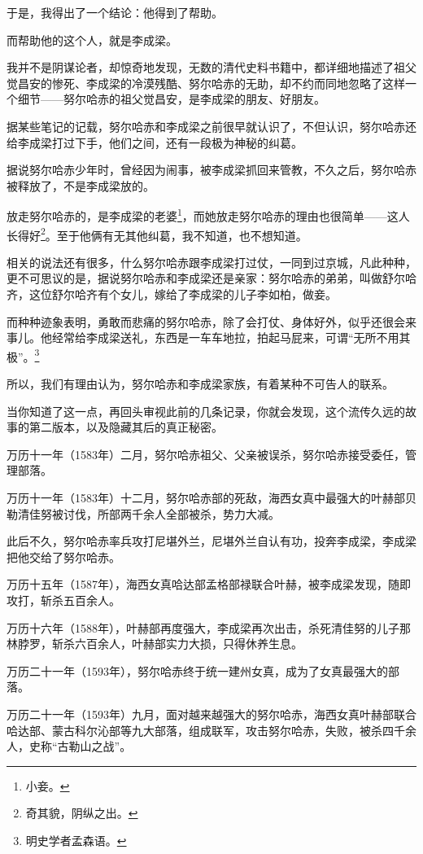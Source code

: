 \begin{multicols}{\theparacolNo}
于是，我得出了一个结论：他得到了帮助。

而帮助他的这个人，就是李成梁。

我并不是阴谋论者，却惊奇地发现，无数的清代史料书籍中，都详细地描述了祖父觉昌安的惨死、李成梁的冷漠残酷、努尔哈赤的无助，却不约而同地忽略了这样一个细节——努尔哈赤的祖父觉昌安，是李成梁的朋友、好朋友。

据某些笔记的记载，努尔哈赤和李成梁之前很早就认识了，不但认识，努尔哈赤还给李成梁打过下手，他们之间，还有一段极为神秘的纠葛。

据说努尔哈赤少年时，曾经因为闹事，被李成梁抓回来管教，不久之后，努尔哈赤被释放了，不是李成梁放的。

放走努尔哈赤的，是李成梁的老婆\footnote{小妾。}，而她放走努尔哈赤的理由也很简单——这人长得好\footnote{奇其貌，阴纵之出。}。至于他俩有无其他纠葛，我不知道，也不想知道。

相关的说法还有很多，什么努尔哈赤跟李成梁打过仗，一同到过京城，凡此种种，更不可思议的是，据说努尔哈赤和李成梁还是亲家：努尔哈赤的弟弟，叫做舒尔哈齐，这位舒尔哈齐有个女儿，嫁给了李成梁的儿子李如柏，做妾。

而种种迹象表明，勇敢而悲痛的努尔哈赤，除了会打仗、身体好外，似乎还很会来事儿。他经常给李成梁送礼，东西是一车车地拉，拍起马屁来，可谓“无所不用其极”。\footnote{明史学者孟森语。}

所以，我们有理由认为，努尔哈赤和李成梁家族，有着某种不可告人的联系。

当你知道了这一点，再回头审视此前的几条记录，你就会发现，这个流传久远的故事的第二版本，以及隐藏其后的真正秘密。

万历十一年（1583年）二月，努尔哈赤祖父、父亲被误杀，努尔哈赤接受委任，管理部落。

万历十一年（1583年）十二月，努尔哈赤部的死敌，海西女真中最强大的叶赫部贝勒清佳努被讨伐，所部两千余人全部被杀，势力大减。

此后不久，努尔哈赤率兵攻打尼堪外兰，尼堪外兰自认有功，投奔李成梁，李成梁把他交给了努尔哈赤。

万历十五年（1587年），海西女真哈达部孟格部禄联合叶赫，被李成梁发现，随即攻打，斩杀五百余人。

万历十六年（1588年），叶赫部再度强大，李成梁再次出击，杀死清佳努的儿子那林脖罗，斩杀六百余人，叶赫部实力大损，只得休养生息。

万历二十一年（1593年），努尔哈赤终于统一建州女真，成为了女真最强大的部落。

万历二十一年（1593年）九月，面对越来越强大的努尔哈赤，海西女真叶赫部联合哈达部、蒙古科尔沁部等九大部落，组成联军，攻击努尔哈赤，失败，被杀四千余人，史称“古勒山之战”。


\end{multicols}
